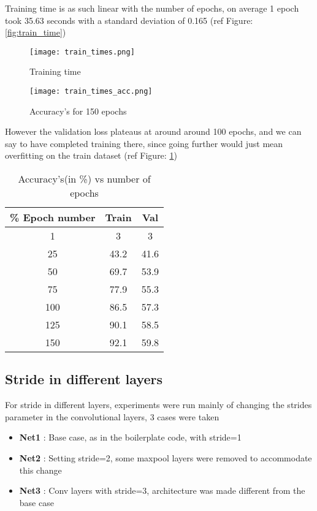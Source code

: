 \documentclass{article}
\begin{document}
\noindent
Training time is as such linear with the number of epochs, on average 1 epoch took 35.63 seconds with a standard deviation of 0.165 (ref Figure: \ref{fig:train_time})

\begin{figure}[H]
\centering
\begin{minipage}{.5\linewidth}
    \centering
    \texttt{[image: train\_times.png]}
    \vspace{-1.0em}
    \caption{Training time}
    \label{fig:train_time}
\end{minipage}%
\begin{minipage}{.5\textwidth}
  \centering
  \texttt{[image: train\_times\_acc.png]}
  \vspace{-1.0em}
  \caption{Accuracy's for 150 epochs}
  \label{fig:train_acc_comp}
\end{minipage}
\end{figure}

\noindent
However the validation loss plateaus at around around 100 epochs, and we can say to have completed training there, since going further would just mean overfitting on the train dataset (ref Figure: \ref{fig:train_acc_comp})

\begin{table}[h!]
\begin{center}
 \begin{tabular}{||c | c c ||} 
 
 \hline
\% Epoch number  &  Train &  Val\\ [0.5ex] 
 \hline\hline
 1 & 3 & 3\\
 \hline
 25 & 43.2 & 41.6\\
 \hline
 50 & 69.7 & 53.9\\
 \hline
 75 & 77.9 & 55.3\\
 \hline
 100 & 86.5 & 57.3\\
 \hline
 125 & 90.1 & 58.5\\
 \hline
 150 & 92.1 & 59.8\\
 \hline
 
\end{tabular}
\end{center}
\label{table:acc_train_times_tab}
\vspace{-1.0em}
\caption{Accuracy's(in \%) vs number of epochs}
\end{table}

\subsection{Stride in different layers}
For stride in different layers, experiments were run mainly of changing the strides parameter in the convolutional layers, 3 cases were taken
\begin{itemize}
    \item \textbf{Net1} : Base case, as in the boilerplate code, with stride=1
    \item \textbf{Net2} : Setting stride=2, some maxpool layers were removed to accommodate this change
    \item \textbf{Net3} : Conv layers with stride=3, architecture was made different from the base case
\end{itemize}
\end{document}
